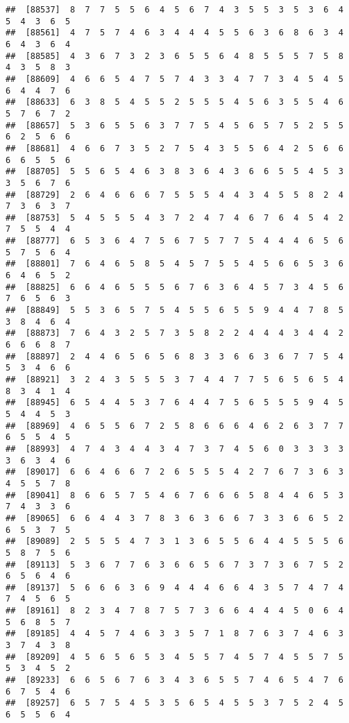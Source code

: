 \documentclass[
]{book}
\begin{document}
\begin{verbatim}
##  [88537]  8  7  7  5  5  6  4  5  6  7  4  3  5  5  3  5  3  6  4  5  4  3  6  5
##  [88561]  4  7  5  7  4  6  3  4  4  4  5  5  6  3  6  8  6  3  4  6  4  3  6  4
##  [88585]  4  3  6  7  3  2  3  6  5  5  6  4  8  5  5  5  7  5  8  4  3  5  8  3
##  [88609]  4  6  6  5  4  7  5  7  4  3  3  4  7  7  3  4  5  4  5  6  4  4  7  6
##  [88633]  6  3  8  5  4  5  5  2  5  5  5  4  5  6  3  5  5  4  6  5  7  6  7  2
##  [88657]  5  3  6  5  5  6  3  7  7  5  4  5  6  5  7  5  2  5  5  6  2  5  6  6
##  [88681]  4  6  6  7  3  5  2  7  5  4  3  5  5  6  4  2  5  6  6  6  6  5  5  6
##  [88705]  5  5  6  5  4  6  3  8  3  6  4  3  6  6  5  5  4  5  3  3  5  6  7  6
##  [88729]  2  6  4  6  6  6  7  5  5  5  4  4  3  4  5  5  8  2  4  7  3  6  3  7
##  [88753]  5  4  5  5  5  4  3  7  2  4  7  4  6  7  6  4  5  4  2  7  5  5  4  4
##  [88777]  6  5  3  6  4  7  5  6  7  5  7  7  5  4  4  4  6  5  6  5  7  5  6  4
##  [88801]  7  6  4  6  5  8  5  4  5  7  5  5  4  5  6  6  5  3  6  6  4  6  5  2
##  [88825]  6  6  4  6  5  5  5  6  7  6  3  6  4  5  7  3  4  5  6  7  6  5  6  3
##  [88849]  5  5  3  6  5  7  5  4  5  5  6  5  5  9  4  4  7  8  5  3  8  4  6  4
##  [88873]  7  6  4  3  2  5  7  3  5  8  2  2  4  4  4  3  4  4  2  6  6  6  8  7
##  [88897]  2  4  4  6  5  6  5  6  8  3  3  6  6  3  6  7  7  5  4  5  3  4  6  6
##  [88921]  3  2  4  3  5  5  5  3  7  4  4  7  7  5  6  5  6  5  4  8  3  4  1  4
##  [88945]  6  5  4  4  5  3  7  6  4  4  7  5  6  5  5  5  9  4  5  5  4  4  5  3
##  [88969]  4  6  5  5  6  7  2  5  8  6  6  6  4  6  2  6  3  7  7  6  5  5  4  5
##  [88993]  4  7  4  3  4  4  3  4  7  3  7  4  5  6  0  3  3  3  3  3  6  3  4  6
##  [89017]  6  6  4  6  6  7  2  6  5  5  5  4  2  7  6  7  3  6  3  4  5  5  7  8
##  [89041]  8  6  6  5  7  5  4  6  7  6  6  6  5  8  4  4  6  5  3  7  4  3  3  6
##  [89065]  6  6  4  4  3  7  8  3  6  3  6  6  7  3  3  6  6  5  2  6  5  3  7  5
##  [89089]  2  5  5  5  4  7  3  1  3  6  5  5  6  4  4  5  5  5  6  5  8  7  5  6
##  [89113]  5  3  6  7  7  6  3  6  6  5  6  7  3  7  3  6  7  5  2  6  5  6  4  6
##  [89137]  5  6  6  6  3  6  9  4  4  4  6  6  4  3  5  7  4  7  4  7  4  5  6  5
##  [89161]  8  2  3  4  7  8  7  5  7  3  6  6  4  4  4  5  0  6  4  5  6  8  5  7
##  [89185]  4  4  5  7  4  6  3  3  5  7  1  8  7  6  3  7  4  6  3  3  7  4  3  8
##  [89209]  4  5  6  5  6  5  3  4  5  5  7  4  5  7  4  5  5  7  5  5  3  4  5  2
##  [89233]  6  6  5  6  7  6  3  4  3  6  5  5  7  4  6  5  4  7  6  6  7  5  4  6
##  [89257]  6  5  7  5  4  5  3  5  6  5  4  5  5  3  7  5  2  4  5  6  5  5  6  4

\end{verbatim}
\end{document}
